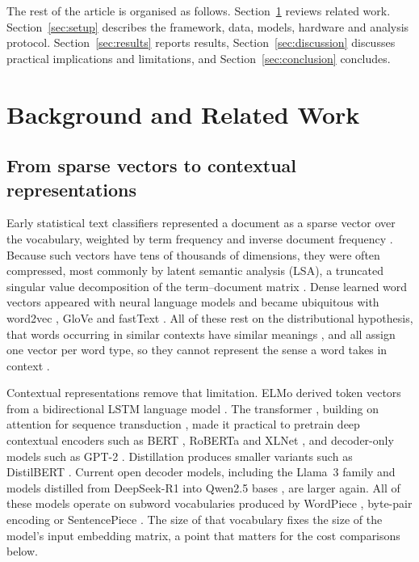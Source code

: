 \documentclass{ijis}
\begin{document}
The rest of the article is organised as follows. Section~\ref{sec:background} reviews related work. Section~\ref{sec:setup} describes the framework, data, models, hardware and analysis protocol. Section~\ref{sec:results} reports results, Section~\ref{sec:discussion} discusses practical implications and limitations, and Section~\ref{sec:conclusion} concludes.

\section{Background and Related Work}\label{sec:background}

\subsection{From sparse vectors to contextual representations}

Early statistical text classifiers represented a document as a sparse vector over the vocabulary, weighted by term frequency and inverse document frequency \cite{sparckjones1972statistical,salton1971smart}. Because such vectors have tens of thousands of dimensions, they were often compressed, most commonly by latent semantic analysis (LSA), a truncated singular value decomposition of the term--document matrix \cite{deerwester}. Dense learned word vectors appeared with neural language models \cite{bengio2003neural,collobert2011natural} and became ubiquitous with word2vec \cite{mikolov,mikolov2013distributed}, GloVe \cite{pennington} and fastText \cite{articleboja,mikolov2018advances}. All of these rest on the distributional hypothesis, that words occurring in similar contexts have similar meanings \cite{harris,firth}, and all assign one vector per word type, so they cannot represent the sense a word takes in context \cite{worth}.

Contextual representations remove that limitation. ELMo derived token vectors from a bidirectional LSTM language model \cite{peters2018deep}. The transformer \cite{vaswani}, building on attention for sequence transduction \cite{bahdanau2016neuralmachinetranslationjointly}, made it practical to pretrain deep contextual encoders such as BERT \cite{devlin-etal-2019-bert}, RoBERTa \cite{liu2019roberta} and XLNet \cite{yang2019xlnet}, and decoder-only models such as GPT-2 \cite{radford2019language}. Distillation produces smaller variants such as DistilBERT \cite{hinton2015distilling,sanh2020distilbert}. Current open decoder models, including the Llama~3 family \cite{grattafiori2024llama3} and models distilled from DeepSeek-R1 into Qwen2.5 bases \cite{guo2025deepseek,yang2024qwen25}, are larger again. All of these models operate on subword vocabularies produced by WordPiece \cite{schuster,wu}, byte-pair encoding \cite{gage1994,sennrich-etal-2016-neural} or SentencePiece \cite{kudo2018sentencepiece}. The size of that vocabulary fixes the size of the model's input embedding matrix, a point that matters for the cost comparisons below.
\end{document}

